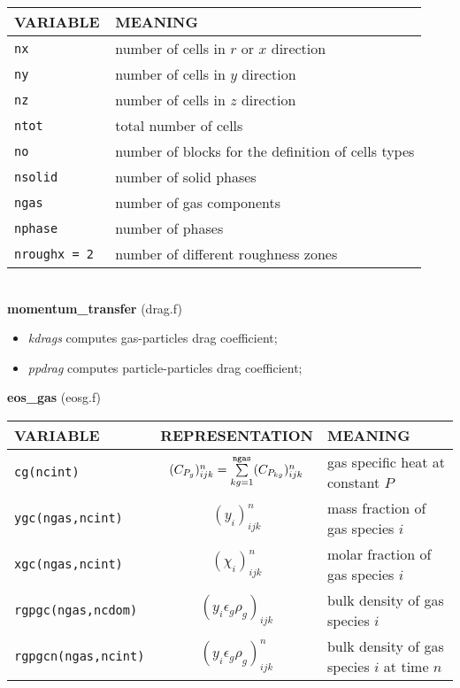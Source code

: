 \begin{tabular}{|p{6cm}|p{6cm}|}\hline
VARIABLE & MEANING\\\hline
\tt  nx    & number of cells in $r$ or $x$ direction\\\hline
\tt  ny    & number of cells in $y$ direction\\\hline
\tt  nz    & number of cells in $z$ direction\\\hline
\tt  ntot  & total number of cells \\\hline
\tt  no   & number of blocks for the definition of cells types\\\hline
\tt  nsolid    & number of solid phases\\\hline
\tt  ngas   & number of gas components\\\hline
\tt  nphase & number of phases\\\hline
\tt  nroughx = 2 & number of different roughness zones\\\hline
\end{tabular}\\[5mm]
%
%
{\large{\bf momentum\_transfer}} (drag.f)\\
\begin{itemize}
\item{\em kdrags} computes gas-particles drag coefficient;
\item{\em ppdrag} computes particle-particles drag coefficient;
\end{itemize}
%
%
{\large {\bf eos\_gas}} (eosg.f)\\[5mm]
\begin{tabular}{|p{6cm}|c|p{6cm}|}\hline
VARIABLE & REPRESENTATION & MEANING\\\hline
\tt cg(ncint)          & $(C_{P_g})_{ijk}^n=\sum\limits_{kg=1}^{\tt ngas}(C_{P_{kg}})_{ijk}^n$ &  gas specific heat at constant $P$\\\hline
\tt ygc(ngas,ncint)    & $(y_i)_{ijk}^n$&  mass fraction of gas species $i$\\ \hline
\tt xgc(ngas,ncint)    & $(\chi_i)_{ijk}^n$&  molar fraction of gas species $i$\\ \hline
\tt rgpgc(ngas,ncdom)  & $(y_{i}\epsilon_g\rho_g)_{ijk}$& bulk density of gas species $i$ \\ \hline
\tt rgpgcn(ngas,ncint) & $(y_{i}\epsilon_g\rho_g)_{ijk}^{n}$& bulk density of gas species $i$ at time $n$ \\ \hline
\end{tabular}\\

